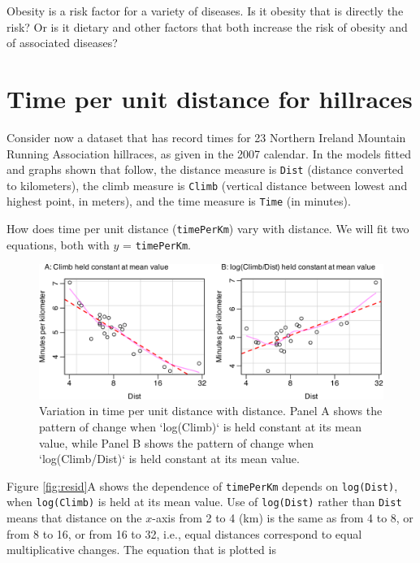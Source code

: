 \documentclass[
  10pt,
  b5paper]{book}
\begin{document}
Obesity is a risk factor for a variety of diseases. Is it
obesity that is directly the risk? Or is it dietary and
other factors that both increase the risk of obesity and
of associated diseases?

\hypertarget{time-per-unit-distance-for-hillraces}{%
\section{Time per unit distance for hillraces}\label{time-per-unit-distance-for-hillraces}}

Consider now a dataset that has record times for 23 Northern Ireland
Mountain Running Association hillraces, as given in the 2007
calendar. In the models fitted and graphs shown that follow,
the distance measure is \texttt{Dist} (distance converted to kilometers),
the climb measure is \texttt{Climb} (vertical distance between lowest
and highest point, in meters), and the time measure is \texttt{Time}
(in minutes).

How does time per unit distance (\texttt{timePerKm}) vary with distance.
We will fit two equations, both with \(y\) = \texttt{timePerKm}.

\begin{figure}[H]

{\centering \includegraphics[width=1\linewidth]{08-observational_files/figure-latex/partial-1} 

}

\caption{Variation in time per unit distance with distance.  Panel A
shows the pattern of change when `log(Climb)` is held constant at its 
mean value, while Panel B shows the pattern of change when 
`log(Climb/Dist)` is held constant at its mean value.}\label{fig:partial}
\end{figure}

Figure \ref{fig:resid}A shows the dependence of
\texttt{timePerKm} depends on \texttt{log(Dist)}, when \texttt{log(Climb)}
is held at its mean value. Use of \texttt{log(Dist)} rather than
\texttt{Dist} means that distance on the \(x\)-axis from 2 to 4 (km)
is the same as from 4 to 8, or from 8 to 16, or from 16 to 32,
i.e., equal distances correspond to equal multiplicative
changes. The equation that is plotted is
\end{document}
